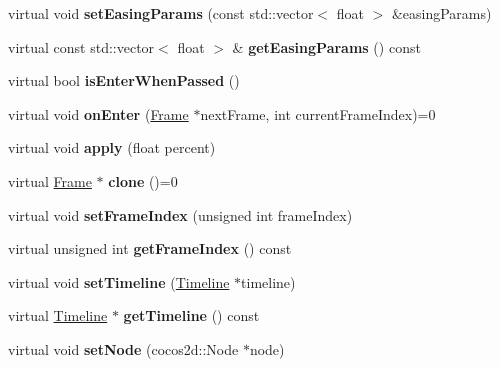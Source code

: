 \begin{DoxyCompactItemize}
\item 
\mbox{\label{classFrame_a9cae916e0f137b86168abd0a428ddfb9}} 
virtual void {\bfseries set\+Easing\+Params} (const std\+::vector$<$ float $>$ \&easing\+Params)
\item 
\mbox{\label{classFrame_a308a164ee9d151b756f49d6eb0d619e7}} 
virtual const std\+::vector$<$ float $>$ \& {\bfseries get\+Easing\+Params} () const
\item 
\mbox{\label{classFrame_a0e51cf62fe94185954ee041cc8d0f951}} 
virtual bool {\bfseries is\+Enter\+When\+Passed} ()
\item 
\mbox{\label{classFrame_a9cb6f0a1c83ddd14aceedeaedb2ec741}} 
virtual void {\bfseries on\+Enter} (\hyperlink{classFrame}{Frame} $\ast$next\+Frame, int current\+Frame\+Index)=0
\item 
\mbox{\label{classFrame_ae76e9de159f11df141912eb37a894994}} 
virtual void {\bfseries apply} (float percent)
\item 
\mbox{\label{classFrame_a4638ff6fc9bdd1985673ac5207ac61cb}} 
virtual \hyperlink{classFrame}{Frame} $\ast$ {\bfseries clone} ()=0
\item 
\mbox{\label{classFrame_a9de1ee01d3e5734bdf7723c296d43bd9}} 
virtual void {\bfseries set\+Frame\+Index} (unsigned int frame\+Index)
\item 
\mbox{\label{classFrame_a9d2806d5116802c7033c8a582c01dc2e}} 
virtual unsigned int {\bfseries get\+Frame\+Index} () const
\item 
\mbox{\label{classFrame_a8170adc5b185d39d45befb67a4539c89}} 
virtual void {\bfseries set\+Timeline} (\hyperlink{classTimeline}{Timeline} $\ast$timeline)
\item 
\mbox{\label{classFrame_a7f5032a7215c0efbc9f0f934507c3eb3}} 
virtual \hyperlink{classTimeline}{Timeline} $\ast$ {\bfseries get\+Timeline} () const
\item 
\mbox{\label{classFrame_aa7dc697fe3d6088636534400c124f90a}} 
virtual void {\bfseries set\+Node} (cocos2d\+::\+Node $\ast$node)

\end{DoxyCompactItemize}

